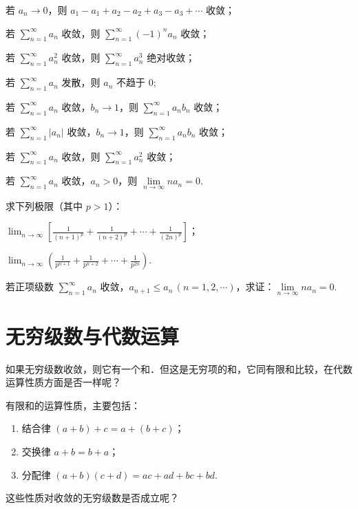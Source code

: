 \begin{xiti}
\begin{ziti}
\item 若 $a_{n}\to0$，则 $a_{1}-a_{1}+a_{2}-a_{2}+a_{3}-a_{3}+\cdots$ 收敛；
\item 若 $\displaystyle\sum_{n=1}^{\infty}a_{n}$ 收敛，则 $\sum_{n=1}^{\infty}(-1)^{n}a_{n}$ 收敛；
\item 若 $\displaystyle\sum_{n=1}^{\infty}a_{n}^{2}$ 收敛，则 $\sum_{n=1}^{\infty}a_{n}^{3}$ 绝对收敛；
\item 若 $\displaystyle\sum_{n=1}^{\infty}a_{n}$ 发散，则 $a_{n}$ 不趋于 $0$;
\item 若 $\displaystyle\sum_{n=1}^{\infty}a_{n}$ 收敛，$b_{n}\to1$，则 $\sum_{n=1}^{\infty}a_{n}b_{n}$ 收敛；
\item 若 $\displaystyle\sum_{n=1}^{\infty}|a_{n}|$ 收敛，$b_{n}\to1$，则 $\sum_{n=1}^{\infty}a_{n}b_{n}$ 收敛；
\item 若 $\displaystyle\sum_{n=1}^{\infty}a_{n}$ 收敛，则 $\sum_{n=1}^{\infty}a_{n}^{2}$ 收敛；
\item 若 $\displaystyle\sum_{n=1}^{\infty}a_{n}$ 收敛，$a_{n}>0$，则 $\lim\limits_{n\to\infty}na_{n}=0$.
\end{ziti}
\item 求下列极限（其中 $p>1$）：
\begin{ziti}
\item $\displaystyle\lim_{n\to\infty}\left[\frac{1}{(n+1)^{p}}+\frac{1}{(n+2)^{p}}+\cdots+\frac{1}{(2n)^{p}}\right]$；
\item $\displaystyle\lim_{n\to\infty}\left(\frac{1}{p^{n+1}}+\frac{1}{p^{n+2}}+\cdots+\frac{1}{p^{2n}}\right)$.
\end{ziti}
\item 若正项级数 $\displaystyle\sum_{n=1}^{\infty}a_{n}$ 收敛，$a_{n+1}\leqslant a_{n}\,(n=1,2,\cdots)$，求证：$\lim\limits_{n\to\infty}na_{n}=0$.
\end{xiti}

\section{无穷级数与代数运算}

如果无穷级数收敛，则它有一个和．但这是无穷项的和，它同有限和比较，在代数运算性质方面是否一样呢？

有限和的运算性质，主要包括：
\begin{enumerate}[label=(\arabic*),leftmargin=3.2em,itemsep=2pt,topsep=2pt]
\item 结合律 $(a+b)+c=a+(b+c)$；
\item 交换律 $a+b=b+a$；
\item 分配律 $(a+b)(c+d)=ac+ad+bc+bd$.
\end{enumerate}
这些性质对收敛的无穷级数是否成立呢？


